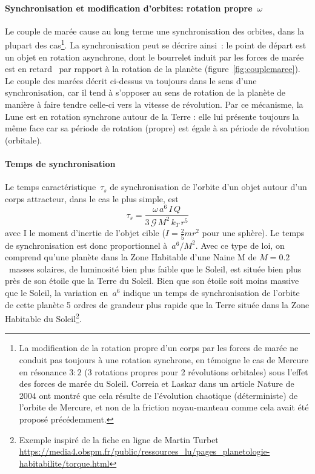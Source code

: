 \paragraph{Synchronisation et modification d'orbites: rotation propre~$\omega$} Le couple de marée cause au long terme une synchronisation des orbites, dans la plupart des cas\footnote{La modification de la rotation propre d'un corps par les forces de marée ne conduit pas toujours à une rotation synchrone, en témoigne le cas de Mercure en résonance $3:2$ (3 rotations propres pour 2 révolutions orbitales) sous l'effet des forces de marée du Soleil. Correia et Laskar dans un article Nature de 2004 ont montré que cela résulte de l'évolution chaotique (déterministe) de l'orbite de Mercure, et non de la friction noyau-manteau comme cela avait été proposé précédemment.}. La synchronisation peut se décrire ainsi~: le point de départ est un objet en rotation asynchrone, dont le bourrelet induit par les forces de marée est \og en retard \fg~par rapport à la rotation de la planète (figure~\ref{fig:couplemaree}). Le couple des marées décrit ci-dessus va toujours dans le sens d'une synchronisation, car il tend à s'opposer au sens de rotation de la planète de manière à faire tendre celle-ci vers la vitesse de révolution. Par ce mécanisme, la Lune est en rotation synchrone autour de la Terre : elle lui présente toujours la même face car sa période de rotation (propre) est égale à sa période de révolution (orbitale).

\sk
\paragraph{Temps de synchronisation} Le temps caractéristique~$\tau_s$ de synchronisation de l'orbite d'un objet autour d'un corps attracteur, dans le cas le plus simple, est
\[ \tau_s = \frac{\omega \, a^6 \, I \, Q}{3 \, \mathcal{G} \, M^2 \, k_T \, r^5} \]
\noindent avec I le moment d'inertie de l'objet cible ($I=\frac{2}{5} m r^2$ pour une sphère). Le temps de synchronisation est donc proportionnel à~$a^6 / M^2$. Avec ce type de loi, on comprend qu'une planète dans la Zone Habitable d'une Naine M de $M = 0.2$~masses solaires, de luminosité bien plus faible que le Soleil, est située bien plus près de son étoile que la Terre du Soleil. Bien que son étoile soit moins massive que le Soleil, la variation en~$a^6$ indique un temps de synchronisation de l'orbite de cette planète 5 ordres de grandeur plus rapide que la Terre située dans la Zone Habitable du Soleil\footnote{Exemple inspiré de la fiche en ligne de Martin Turbet \url{https://media4.obspm.fr/public/ressources_lu/pages_planetologie-habitabilite/torque.html}}. 
